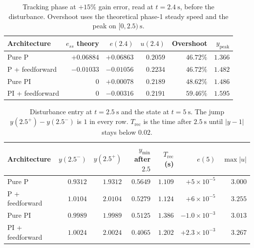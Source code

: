 \documentclass[12pt,a4paper]{article}
\begin{document}
\begin{table}[H]
  \centering
  \caption{Tracking phase at \(+15\%\) gain error, read at \(t=2.4~\mathrm{s}\), before the disturbance. Overshoot uses the theoretical phase-1 steady speed and the peak on \([0,2.5)~\mathrm{s}\).}
  \label{tab:track}
  \small
  \setlength{\tabcolsep}{4pt}
  \begin{tabular}{lrrrrr}
    \toprule
    Architecture & \(e_{ss}\) theory & \(e(2.4)\) & \(u(2.4)\) & Overshoot & \(y_{\mathrm{peak}}\) \\
    \midrule
    Pure P            & \(+0.06884\) & \(+0.06863\) & \(0.2059\) & \(46.72\%\) & \(1.366\) \\
    P + feedforward   & \(-0.01033\) & \(-0.01056\) & \(0.2234\) & \(46.72\%\) & \(1.482\) \\
    Pure PI           & \(0\)        & \(+0.00078\) & \(0.2189\) & \(48.62\%\) & \(1.486\) \\
    PI + feedforward  & \(0\)        & \(-0.00316\) & \(0.2191\) & \(59.46\%\) & \(1.595\) \\
    \bottomrule
  \end{tabular}
\end{table}

\begin{table}[H]
  \centering
  \caption{Disturbance entry at \(t=2.5~\mathrm{s}\) and the state at \(t=5~\mathrm{s}\). The jump \(y(2.5^+)-y(2.5^-)\) is \(1\) in every row. \(T_{\mathrm{rec}}\) is the time after \(2.5~\mathrm{s}\) until \(|y-1|\) stays below \(0.02\).}
  \label{tab:rec}
  \small
  \setlength{\tabcolsep}{4pt}
  \begin{tabular}{lrrrrrr}
    \toprule
    Architecture & \(y(2.5^-)\) & \(y(2.5^+)\) & \(y_{\min}\) after \(2.5\) & \(T_{\mathrm{rec}}\) (s) & \(e(5)\) & \(\max|u|\) \\
    \midrule
    Pure P            & \(0.9312\) & \(1.9312\) & \(0.5649\) & \(1.109\) & \(+5\times 10^{-5}\)  & \(3.000\) \\
    P + feedforward   & \(1.0104\) & \(2.0104\) & \(0.5279\) & \(1.124\) & \(+6\times 10^{-5}\)  & \(3.255\) \\
    Pure PI           & \(0.9989\) & \(1.9989\) & \(0.5125\) & \(1.386\) & \(-1.0\times 10^{-3}\) & \(3.013\) \\
    PI + feedforward  & \(1.0024\) & \(2.0024\) & \(0.4065\) & \(1.202\) & \(+2.3\times 10^{-3}\) & \(3.267\) \\
    \bottomrule
  \end{tabular}
\end{table}
\end{document}

